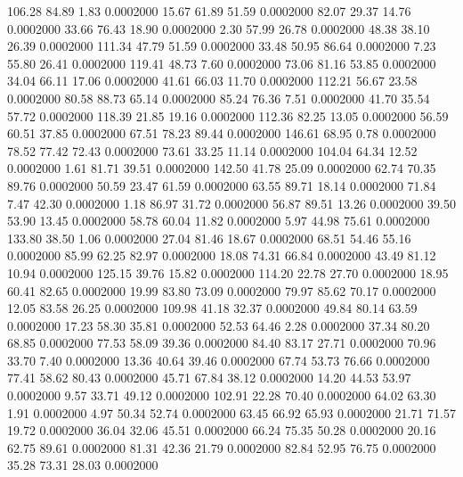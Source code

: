  106.28   84.89    1.83   0.0002000
  15.67   61.89   51.59   0.0002000
  82.07   29.37   14.76   0.0002000
  33.66   76.43   18.90   0.0002000
   2.30   57.99   26.78   0.0002000
  48.38   38.10   26.39   0.0002000
 111.34   47.79   51.59   0.0002000
  33.48   50.95   86.64   0.0002000
   7.23   55.80   26.41   0.0002000
 119.41   48.73    7.60   0.0002000
  73.06   81.16   53.85   0.0002000
  34.04   66.11   17.06   0.0002000
  41.61   66.03   11.70   0.0002000
 112.21   56.67   23.58   0.0002000
  80.58   88.73   65.14   0.0002000
  85.24   76.36    7.51   0.0002000
  41.70   35.54   57.72   0.0002000
 118.39   21.85   19.16   0.0002000
 112.36   82.25   13.05   0.0002000
  56.59   60.51   37.85   0.0002000
  67.51   78.23   89.44   0.0002000
 146.61   68.95    0.78   0.0002000
  78.52   77.42   72.43   0.0002000
  73.61   33.25   11.14   0.0002000
 104.04   64.34   12.52   0.0002000
   1.61   81.71   39.51   0.0002000
 142.50   41.78   25.09   0.0002000
  62.74   70.35   89.76   0.0002000
  50.59   23.47   61.59   0.0002000
  63.55   89.71   18.14   0.0002000
  71.84    7.47   42.30   0.0002000
   1.18   86.97   31.72   0.0002000
  56.87   89.51   13.26   0.0002000
  39.50   53.90   13.45   0.0002000
  58.78   60.04   11.82   0.0002000
   5.97   44.98   75.61   0.0002000
 133.80   38.50    1.06   0.0002000
  27.04   81.46   18.67   0.0002000
  68.51   54.46   55.16   0.0002000
  85.99   62.25   82.97   0.0002000
  18.08   74.31   66.84   0.0002000
  43.49   81.12   10.94   0.0002000
 125.15   39.76   15.82   0.0002000
 114.20   22.78   27.70   0.0002000
  18.95   60.41   82.65   0.0002000
  19.99   83.80   73.09   0.0002000
  79.97   85.62   70.17   0.0002000
  12.05   83.58   26.25   0.0002000
 109.98   41.18   32.37   0.0002000
  49.84   80.14   63.59   0.0002000
  17.23   58.30   35.81   0.0002000
  52.53   64.46    2.28   0.0002000
  37.34   80.20   68.85   0.0002000
  77.53   58.09   39.36   0.0002000
  84.40   83.17   27.71   0.0002000
  70.96   33.70    7.40   0.0002000
  13.36   40.64   39.46   0.0002000
  67.74   53.73   76.66   0.0002000
  77.41   58.62   80.43   0.0002000
  45.71   67.84   38.12   0.0002000
  14.20   44.53   53.97   0.0002000
   9.57   33.71   49.12   0.0002000
 102.91   22.28   70.40   0.0002000
  64.02   63.30    1.91   0.0002000
   4.97   50.34   52.74   0.0002000
  63.45   66.92   65.93   0.0002000
  21.71   71.57   19.72   0.0002000
  36.04   32.06   45.51   0.0002000
  66.24   75.35   50.28   0.0002000
  20.16   62.75   89.61   0.0002000
  81.31   42.36   21.79   0.0002000
  82.84   52.95   76.75   0.0002000
  35.28   73.31   28.03   0.0002000

